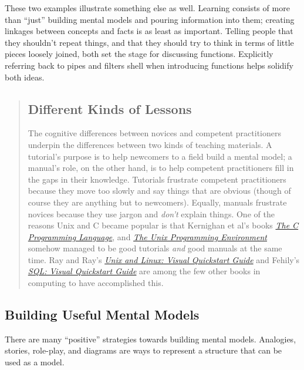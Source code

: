 These two examples illustrate something else as well.
Learning consists of more than ``just'' building mental models
and pouring information into them;
creating linkages between concepts and facts is as least as important.
Telling people that they shouldn't repeat things,
and that they should try to think in terms of little pieces loosely joined,
both set the stage for discussing functions.
Explicitly referring back to pipes and filters shell when introducing functions
helps solidify both ideas.

\begin{quotation}   %
\subsection*{Different Kinds of Lessons}

The cognitive differences between novices and competent practitioners underpin
the differences between two kinds of teaching materials.
A tutorial's purpose is to help newcomers to a field build a mental model;
a manual's role, on the other hand, is to help competent practitioners fill in the gaps in their knowledge.
Tutorials frustrate competent practitioners because they move too slowly and say things that are obvious
(though of course they are anything but to newcomers).
Equally,
manuals frustrate novices because they use jargon and \emph{don't} explain things.
One of the reasons Unix and C became popular is that
Kernighan et al's books
\emph{\href{http://www.amazon.com/Programming-Language-Brian-W-Kernighan/dp/0131103628/}{The C Programming Language}},
and
\emph{\href{http://www.amazon.com/Unix-Programming-Environment-Prentice-Hall-Software/dp/013937681X/}{The Unix Programming Environment}}
somehow managed to be good tutorials \emph{and} good manuals at the same time.
Ray and Ray's \emph{\href{http://www.amazon.com/Unix-Linux-Visual-QuickStart-Guide/dp/0321997549/}{Unix and Linux: Visual Quickstart Guide}}
and Fehily's \emph{\href{http://www.amazon.com/SQL-Visual-QuickStart-Guide-3rd/dp/0321553578/}{SQL: Visual Quickstart Guide}}
are among the few other books in computing to have accomplished this.
\end{quotation}   %

\subsection*{Building Useful Mental Models}

There are many ``positive'' strategies towards building mental models.  Analogies,
stories, role-play, and diagrams are ways to represent a structure that
can be used as a model.

